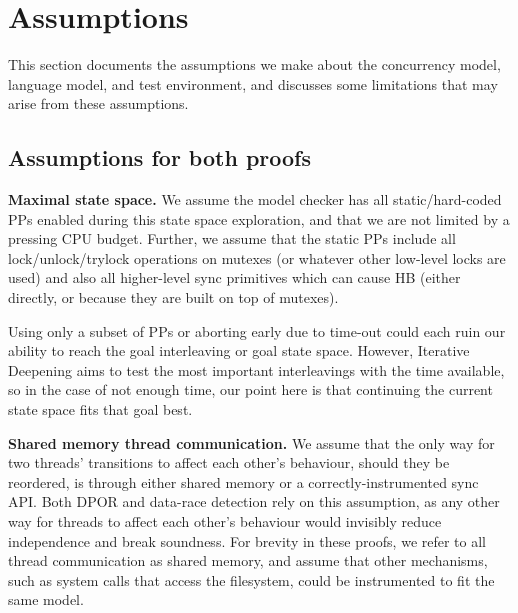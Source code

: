 \section{Assumptions}

This section documents the assumptions we make about the concurrency model, language model, and test environment,
and discusses some limitations that may arise from these assumptions.

\subsection{Assumptions for both proofs}

{\bf Maximal state space.}
We assume the model checker has all static/hard-coded PPs enabled during this state space exploration,
and that we are not limited by a pressing CPU budget.
Further, we assume that the static PPs include all lock/unlock/trylock operations on mutexes (or whatever other low-level locks are used) and also all higher-level sync primitives which can cause HB (either directly, or because they are built on top of mutexes).

Using only a subset of PPs or aborting early due to time-out could each ruin our ability to reach the goal interleaving or goal state space.
However, Iterative Deepening aims to test the most important interleavings with the time available,
so in the case of not enough time, our point here is that continuing the current state space fits that goal best.


{\bf Shared memory thread communication.}
We assume that the only way for two threads' transitions to affect each other's behaviour, should they be reordered,
is through either shared memory or a correctly-instrumented sync API.
Both DPOR and data-race detection rely on this assumption,
as any other way for threads to affect each other's behaviour would invisibly reduce independence and break soundness.
For brevity in these proofs, we refer to all thread communication as shared memory,
and assume that other mechanisms, such as system calls that access the filesystem, could be instrumented to fit the same model.

